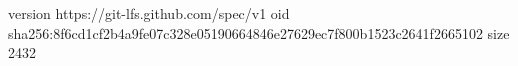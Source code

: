 version https://git-lfs.github.com/spec/v1
oid sha256:8f6cd1cf2b4a9fe07c328e05190664846e27629ec7f800b1523c2641f2665102
size 2432
